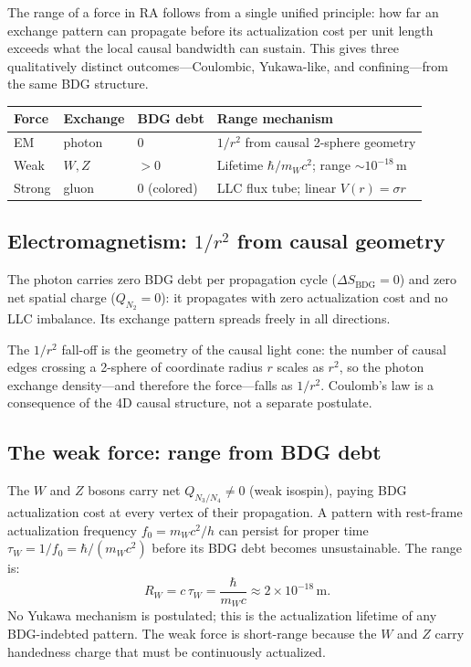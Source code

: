 \documentclass[11pt]{article}
\begin{document}
The range of a force in RA follows from a single unified principle: how far an exchange pattern can propagate before its actualization cost per unit length exceeds what the local causal bandwidth can sustain. This gives three qualitatively distinct outcomes---Coulombic, Yukawa-like, and confining---from the same BDG structure.

\begin{center}
\begin{tabular}{llll}
\toprule
Force & Exchange & BDG debt & Range mechanism \\
\midrule
EM & photon & 0 & $1/r^2$ from causal 2-sphere geometry \\
Weak & $W,Z$ & $>0$ & Lifetime $\hbar/m_W c^2$; range $\sim 10^{-18}$\,m \\
Strong & gluon & 0 (colored) & LLC flux tube; linear $V(r)=\sigma r$ \\
\bottomrule
\end{tabular}
\end{center}

\subsection{Electromagnetism: $1/r^2$ from causal geometry}

The photon carries zero BDG debt per propagation cycle ($\Delta S_{\mathrm{BDG}}=0$) and zero net spatial charge ($Q_{N_2}=0$): it propagates with zero actualization cost and no LLC imbalance. Its exchange pattern spreads freely in all directions.

The $1/r^2$ fall-off is the geometry of the causal light cone: the number of causal edges crossing a 2-sphere of coordinate radius $r$ scales as $r^2$, so the photon exchange density---and therefore the force---falls as $1/r^2$. Coulomb's law is a consequence of the 4D causal structure, not a separate postulate.

\subsection{The weak force: range from BDG debt}

The $W$ and $Z$ bosons carry net $Q_{N_3/N_4}\ne 0$ (weak isospin), paying BDG actualization cost at every vertex of their propagation. A pattern with rest-frame actualization frequency $f_0=m_W c^2/h$ can persist for proper time $\tau_W=1/f_0=\hbar/(m_W c^2)$ before its BDG debt becomes unsustainable. The range is:
\begin{equation}
R_W = c\,\tau_W = \frac{\hbar}{m_W c} \approx 2\times 10^{-18}\,\mathrm{m}.
\end{equation}
No Yukawa mechanism is postulated; this is the actualization lifetime of any BDG-indebted pattern. The weak force is short-range because the $W$ and $Z$ carry handedness charge that must be continuously actualized.
\end{document}
